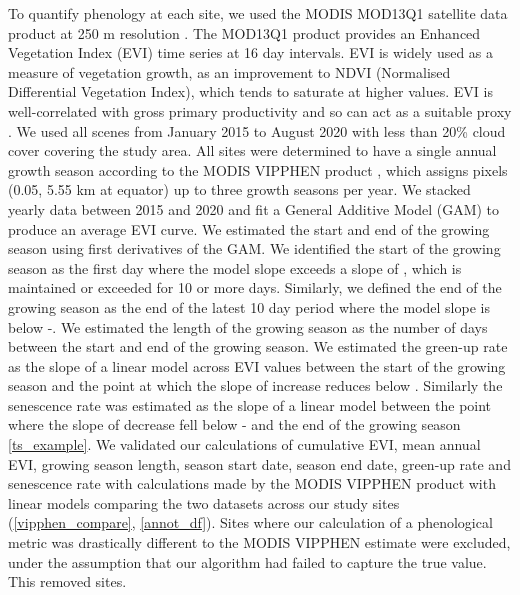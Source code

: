 \documentclass[11pt,a4paper]{article}
\begin{document}
To quantify phenology at each site, we used the MODIS MOD13Q1 satellite data product at 250 m resolution \citep{MOD13Q1}. The MOD13Q1 product provides an Enhanced Vegetation Index (EVI) time series at 16 day intervals. EVI is widely used as a measure of vegetation growth, as an improvement to NDVI (Normalised Differential Vegetation Index), which tends to saturate at higher values. EVI is well-correlated with gross primary productivity and so can act as a suitable proxy \citep{}. We used all scenes from January 2015 to August 2020 with less than 20\% cloud cover covering the study area. All sites were determined to have a single annual growth season according to the MODIS VIPPHEN product \citep{}, which assigns pixels (0.05\textdegree, 5.55 km at equator) up to three growth seasons per year. We stacked yearly data between 2015 and 2020 and fit a General Additive Model (GAM) to produce an average EVI curve. We estimated the start and end of the growing season using first derivatives of the GAM. We identified the start of the growing season as the first day where the model slope exceeds a slope of \modisSLC{}, which is maintained or exceeded for 10 or more days. Similarly, we defined the end of the growing season as the end of the latest 10 day period where the model slope is below -\modisSLC{}. We estimated the length of the growing season as the number of days between the start and end of the growing season. We estimated the green-up rate as the slope of a linear model across EVI values between the start of the growing season and the point at which the slope of increase reduces below \modisSLC{}. Similarly the senescence rate was estimated as the slope of a linear model between the point where the slope of decrease fell below -\modisSLC{} and the end of the growing season \autoref{ts_example}. We validated our calculations of cumulative EVI, mean annual EVI, growing season length, season start date, season end date, green-up rate and senescence rate with calculations made by the MODIS VIPPHEN product with linear models comparing the two datasets across our study sites (\autoref{vipphen_compare}, \autoref{annot_df}). Sites where our calculation of a phenological metric was drastically different to the MODIS VIPPHEN estimate were excluded, under the assumption that our algorithm had failed to capture the true value. This removed \vipphenOutlier{} sites.
\end{document}
